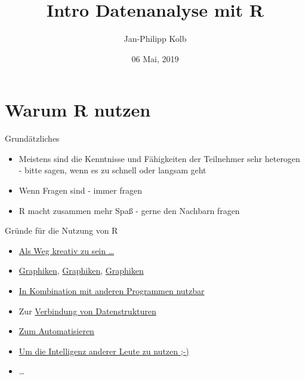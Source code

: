 \documentclass[
  ignorenonframetext,
]{beamer}
\title{Intro Datenanalyse mit R}
\author{Jan-Philipp Kolb}
\date{06 Mai, 2019}
\providecommand{\tightlist}{%
  \setlength{\itemsep}{0pt}\setlength{\parskip}{0pt}}
\begin{document}
\frame{\titlepage}

\hypertarget{warum-r-nutzen}{%
\section{Warum R nutzen}\label{warum-r-nutzen}}

\begin{frame}{Grundätzliches}
\protect\hypertarget{grundatzliches}{}

\begin{itemize}
\tightlist
\item
  Meistens sind die Kenntnisse und Fähigkeiten der Teilnehmer sehr
  heterogen - bitte sagen, wenn es zu schnell oder langsam geht
\item
  Wenn Fragen sind - immer fragen
\item
  R macht zusammen mehr Spaß - gerne den Nachbarn fragen
\end{itemize}

\end{frame}

\begin{frame}{Gründe für die Nutzung von R}
\protect\hypertarget{grunde-fur-die-nutzung-von-r}{}

\begin{itemize}
\tightlist
\item
  \href{http://blog.revolutionanalytics.com/2015/10/r-user-groups-highlight-r-creativity.html}{Als
  Weg kreativ zu sein \ldots{}}
\item
  \href{http://matthewlincoln.net/2014/12/20/adjacency-matrix-plots-with-r-and-ggplot2.html}{Graphiken},
  \href{https://www.r-bloggers.com/3d-plots-with-ggplot2-and-plotly/}{Graphiken},
  \href{https://procomun.wordpress.com/2011/03/18/splomr/}{Graphiken}
\item
  \href{https://github.com/Japhilko/RInterfaces}{In Kombination mit
  anderen Programmen nutzbar}
\item
  Zur
  \href{https://github.com/Japhilko/RInterfaces/blob/master/slides/Datenimport.md}{Verbindung
  von Datenstrukturen}
\item
  \href{https://cran.r-project.org/web/packages/MplusAutomation/index.html}{Zum
  Automatisieren}
\item
  \href{https://www.r-bloggers.com/}{Um die Intelligenz anderer Leute zu
  nutzen ;-)}
\item
  \ldots{}
\end{itemize}

\end{frame}
\end{document}

